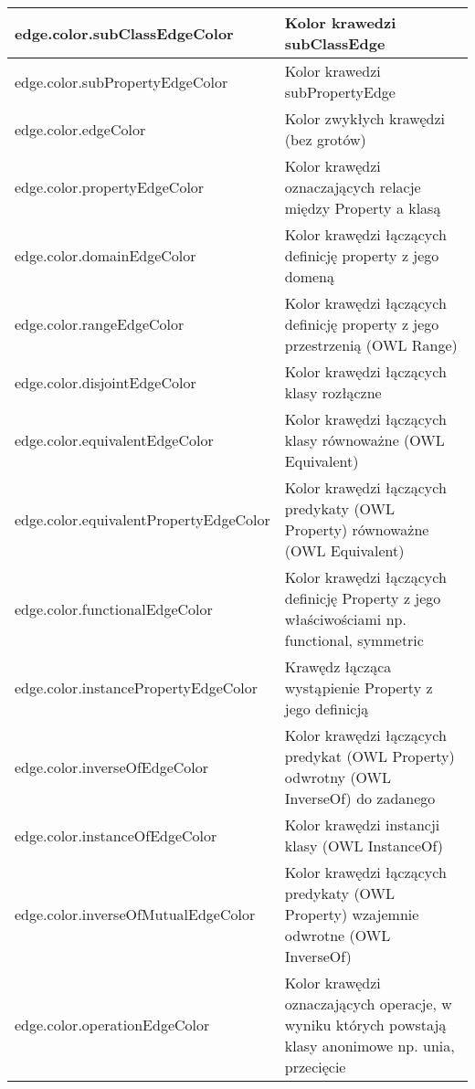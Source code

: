 \begin{longtable}{|l|m{7cm}|}
edge.color.subClassEdgeColor & Kolor krawedzi subClassEdge   \\ \hline
edge.color.subPropertyEdgeColor & Kolor krawedzi subPropertyEdge   \\ \hline
edge.color.edgeColor & Kolor zwykłych krawędzi (bez grotów)   \\ \hline
edge.color.propertyEdgeColor & Kolor krawędzi oznaczających relacje między Property a klasą   \\ \hline
edge.color.domainEdgeColor & Kolor krawędzi łączących definicję property z jego domeną  \\ \hline
edge.color.rangeEdgeColor & Kolor krawędzi łączących definicję property z jego przestrzenią (OWL Range)   \\ \hline
edge.color.disjointEdgeColor & Kolor krawędzi łączących klasy rozłączne  \\ \hline
edge.color.equivalentEdgeColor & Kolor krawędzi łączących klasy równoważne (OWL Equivalent)   \\ \hline
edge.color.equivalentPropertyEdgeColor & Kolor krawędzi łączących predykaty (OWL Property) równoważne (OWL Equivalent)   \\ \hline
edge.color.functionalEdgeColor & Kolor krawędzi łączących definicję Property z jego właściwościami np. functional, symmetric  \\ \hline
edge.color.instancePropertyEdgeColor & Krawędz łącząca wystąpienie Property z jego definicją    \\ \hline
edge.color.inverseOfEdgeColor & Kolor krawędzi łączących predykat (OWL Property) odwrotny (OWL InverseOf) do zadanego   \\ \hline
edge.color.instanceOfEdgeColor & Kolor krawędzi instancji klasy (OWL InstanceOf)   \\ \hline 
edge.color.inverseOfMutualEdgeColor & Kolor krawędzi łączących predykaty (OWL Property) wzajemnie odwrotne (OWL InverseOf)   \\ \hline 
edge.color.operationEdgeColor & Kolor krawędzi oznaczających operacje, w wyniku których powstają klasy anonimowe np. unia, przecięcie   \\ \hline

\end{longtable}

